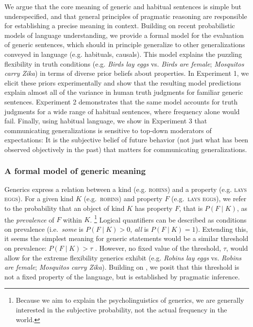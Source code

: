 \documentclass[11pt,letterpaper]{article}
\begin{document}
We argue that the core meaning of generic and habitual sentences is simple but underspecified, and that general principles of pragmatic reasoning are responsible for establishing a precise meaning in context. 
Building on recent probabilistic models of language understanding, we provide a formal model for the evaluation of generic sentences, which should in principle generalize to other generalizations conveyed in language (e.g. habituals, causals). 
This model explains the puzzling flexibility in truth conditions (e.g. \emph{Birds lay eggs} vs. \emph{Birds are female}; \emph{Mosquitos carry Zika}) in terms of diverse prior beliefs about properties.
In Experiment 1, we elicit these priors experimentally and show that the resulting model predictions explain almost all of the variance in human truth judgments for familiar generic sentences.
Experiment 2 demonstrates that the same model accounts for truth judgments for a wide range of habitual sentences, where frequency alone would fail.
Finally, using habitual language, we show in Experiment 3 that communicating generalizations is sensitive to top-down moderators of expectations: It is the subjective belief of future behavior (not just what has been observed objectively in the past) that matters for communicating generalizations.


\subsubsection*{A formal model of generic meaning}

Generics express a relation between a kind (e.g. \textsc{robins}) and a property (e.g. \textsc{lays eggs}). 
For a given kind $K$ (e.g.~\textsc{robins}) and property $F$ (e.g.~\textsc{lays eggs}), we refer to the probability that an object of kind $K$ has property $F$, that is $P(F\mid K)$, as the \emph{prevalence} of $F$ within $K$.
\footnote{Because we aim to explain the psycholinguistics of generics, we are generally interested in the subjective probability, not the actual frequency in the world.}
Logical quantifiers can be described as conditions on prevalence (i.e.~\emph{some} is $P(F\mid K)>0$, \emph{all} is $P(F\mid K)=1$). 
Extending this, it seems the simplest meaning for generic statements would be a similar threshold on prevalence: $P(F\mid K)>\tau$ \cite{Cohen1999}. 
However, no fixed value of the threshold, $\tau$, would allow for the extreme flexibility generics exhibit (e.g. \emph{Robins lay eggs} vs. \emph{Robins are female}; \emph{Mosquitos carry Zika}).
Building on , we posit that this threshold is not a fixed property of the language, but is established by pragmatic inference.
\end{document}
